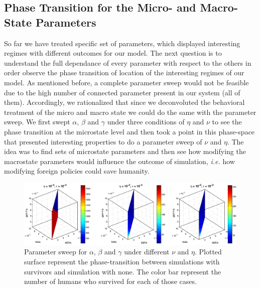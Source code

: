\documentclass[11pt]{article} %
\begin{document}
\subsection{Phase Transition for the Micro- and Macro-State Parameters }\indent

So far we have treated specific set of parameters, which displayed interesting regimes with different outcomes for our model. The next question is to understand the full dependance of every parameter with respect to the others in order observe the phase transition of location of the interesting regimes of our model. As mentioned before, a complete parameter sweep would not be feasible due to the high number of connected parameter present in our system (all of them). Accordingly, we rationalized that since we deconvoluted the behavioral treatment of the micro and macro state we could do the same with the parameter sweep. We first swept $\alpha$, $\beta$ and $\gamma$ under three conditions of $\eta$ and $\nu$ to see the phase transition at the microstate level and then took a point in this phase-space that presented interesting properties to do a parameter sweep of $\nu$ and $\eta$. The idea was to find sets of microstate parameters and then see how modifying the macrostate parameters would influence the outcome of simulation, \textit{i.e.} how modifying foreign policies could save humanity.
\begin{figure}[h!]
\centerline{
\includegraphics[scale=0.45]{../images/Matlab_figures/a-b-g-sweep.eps}}
\caption{Parameter sweep for $\alpha$, $\beta$ and $\gamma$ under different $\nu$ and $\eta$. Plotted surface represent the phase-transition between simulations with survivors and simulation with none. The color bar represent the number of humans who survived for each of those cases.  \label{a-b-g} }
\end{figure}
\end{document}
